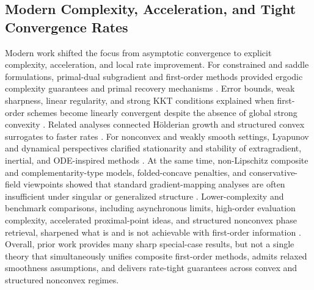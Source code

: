 \documentclass[11pt]{article}
\begin{document}
\subsection{Modern Complexity, Acceleration, and Tight Convergence Rates}
Modern work shifted the focus from asymptotic convergence to explicit complexity, acceleration, and local rate improvement. For constrained and saddle formulations, primal-dual subgradient and first-order methods provided ergodic complexity guarantees and primal recovery mechanisms \citep{Nesterov_2007, Sen_1986, unknown1999ergodic, _nnheim_2016, Lan_2009, unknown2019iteration}. Error bounds, weak sharpness, linear regularity, and strong KKT conditions explained when first-order schemes become linearly convergent despite the absence of global strong convexity \citep{unknown1999strong, C_novas_2009, unknown1999linear, unknown2019new, Zhou_2017, Tseng_2010, Zheng_2009, Burke_2005}. Related analyses connected H\"olderian growth and structured convex surrogates to faster rates \citep{unknown2019faster, Tseng_2010}. For nonconvex and weakly smooth settings, Lyapunov and dynamical perspectives clarified stationarity and stability of extragradient, inertial, and ODE-inspired methods \citep{Goudou_2007, unknown2026lyapunov, Lu_2021}. At the same time, non-Lipschitz composite and complementarity-type models, folded-concave penalties, and conservative-field viewpoints showed that standard gradient-mapping analyses are often insufficient under singular or generalized structure \citep{unknown2001convex, unknown2019mathematical, Liu_2017, unknown2020conservative}. Lower-complexity and benchmark comparisons, including asynchronous limits, high-order evaluation complexity, accelerated proximal-point ideas, and structured nonconvex phase retrieval, sharpened what is and is not achievable with first-order information \citep{unknown2020fully, Cartis_2010, unknown2021accelerated, unknown2019gradient, unknown2020high}. Overall, prior work provides many sharp special-case results, but not a single theory that simultaneously unifies composite first-order methods, admits relaxed smoothness assumptions, and delivers rate-tight guarantees across convex and structured nonconvex regimes.



\end{document}
